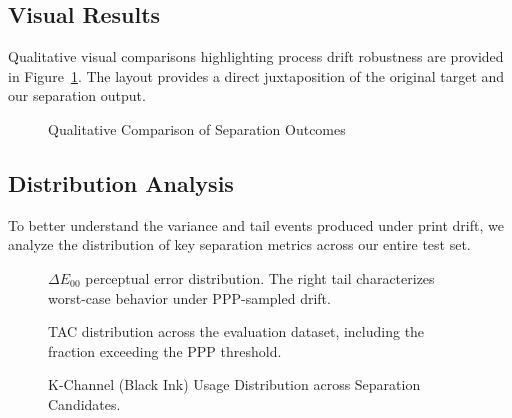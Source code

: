 \documentclass[11pt]{article}
\begin{document}
\subsection{Visual Results}

Qualitative visual comparisons highlighting process drift robustness are provided in Figure~\ref{fig:visual_comparison}. The layout provides a direct juxtaposition of the original target and our separation output.

\begin{figure}[htbp]
\centering
{}
\caption{Qualitative Comparison of Separation Outcomes}
\label{fig:visual_comparison}
\end{figure}

\subsection{Distribution Analysis}

To better understand the variance and tail events produced under print drift, we analyze the distribution of key separation metrics across our entire test set.

\begin{figure}[htbp]
\centering
{}
\caption{$\Delta E_{00}$ perceptual error distribution. The right tail characterizes worst-case behavior under PPP-sampled drift.}
\label{fig:de_dist}
\end{figure}

\begin{figure}[htbp]
\centering
{}
\caption{TAC distribution across the evaluation dataset, including the fraction exceeding the PPP threshold.}
\label{fig:tac_dist}
\end{figure}

\begin{figure}[htbp]
\centering
{}
\caption{K-Channel (Black Ink) Usage Distribution across Separation Candidates.}
\label{fig:k_dist}
\end{figure}
\end{document}
